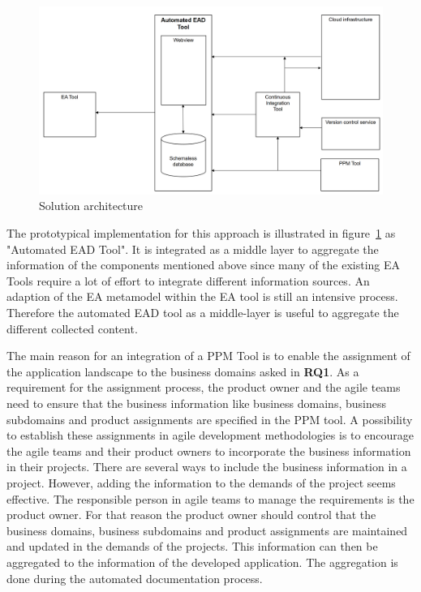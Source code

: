 \begin{figure}[htpb]
  \centering
  \includegraphics[width=1.0\textwidth]{figures/solution-architecture-general.PNG}
  \caption{Solution architecture}
  \label{fig:solution-architecture-general}
\end{figure}

The prototypical implementation for this approach is illustrated in figure~\ref{fig:solution-architecture-general} as "Automated EAD Tool". It is integrated as a middle layer to aggregate the information of the components mentioned above since many of the existing EA Tools require a lot of effort to integrate different information sources. An adaption of the EA metamodel within the EA tool is still an intensive process. Therefore the automated EAD tool as a middle-layer is useful to aggregate the different collected content.

The main reason for an integration of a PPM Tool is to enable the assignment of the application landscape to the business domains asked in \textbf{RQ1}. As a requirement for the assignment process, the product owner and the agile teams need to ensure that the business information like business domains, business subdomains and product assignments are specified in the PPM tool.
A possibility to establish these assignments in agile development methodologies is to encourage the agile teams and their product owners to incorporate the business information in their projects.
There are several ways to include the business information in a project. However, adding the information to the demands of the project seems effective. The responsible person in agile teams to manage the requirements is the product owner.
For that reason the product owner should control that the business domains, business subdomains and product assignments are maintained and updated in the demands of the projects. This information can then be aggregated to the information of the developed application. The aggregation is done during the automated documentation process.

